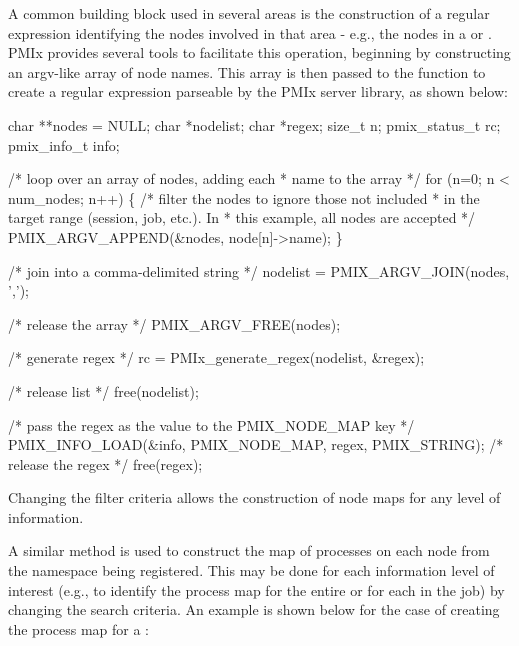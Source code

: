 \label{cptr:api_server:noderegex}A common building block used in several areas is the construction of a regular expression identifying the nodes involved in that area - e.g., the nodes in a  or . \ac{PMIx} provides several tools to facilitate this operation, beginning by constructing an argv-like array of node names. This array is then passed to the  function to create a regular expression parseable by the \ac{PMIx} server library, as shown below:

\cspecificstart
\begin{codepar}
char **nodes = NULL;
char *nodelist;
char *regex;
size_t n;
pmix_status_t rc;
pmix_info_t info;

/* loop over an array of nodes, adding each
 * name to the array */
for (n=0; n < num_nodes; n++) \{
    /* filter the nodes to ignore those not included
     * in the target range (session, job, etc.). In
     * this example, all nodes are accepted */
    PMIX_ARGV_APPEND(&nodes, node[n]->name);
\}

/* join into a comma-delimited string */
nodelist = PMIX_ARGV_JOIN(nodes, ',');

/* release the array */
PMIX_ARGV_FREE(nodes);

/* generate regex */
rc = PMIx_generate_regex(nodelist, &regex);

/* release list */
free(nodelist);

/* pass the regex as the value to the PMIX_NODE_MAP key */
PMIX_INFO_LOAD(&info, PMIX_NODE_MAP, regex, PMIX_STRING);
/* release the regex */
free(regex);
\end{codepar}
\cspecificend

Changing the filter criteria allows the construction of node maps for any level of information.

\label{cptr:api_server:ppnregex}A similar method is used to construct the map of processes on each node from the namespace being registered. This may be done for each information level of interest (e.g., to identify the process map for the entire  or for each  in the job) by changing the search criteria. An example is shown below for the case of creating the process map for a :

